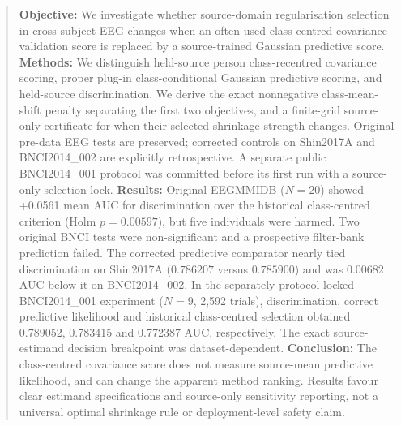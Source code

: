 \begin{abstract}
\textbf{Objective:} We investigate whether
source-domain regularisation selection in
cross-subject EEG changes when an
often-used class-centred covariance
validation score is replaced by a
source-trained Gaussian predictive score.
\textbf{Methods:} We distinguish held-source
person class-recentred covariance scoring,
proper plug-in class-conditional Gaussian
predictive scoring, and held-source
discrimination. We derive the exact
nonnegative class-mean-shift penalty
separating the first two objectives,
and a finite-grid source-only certificate
for when their selected shrinkage
strength changes. Original pre-data
EEG tests are preserved; corrected
controls on Shin2017A and
BNCI2014\_002 are explicitly
retrospective. A separate public
BNCI2014\_001 protocol was
committed before its first run
with a source-only selection lock.
\textbf{Results:} Original EEGMMIDB
(\(N=20\)) showed +0.0561 mean
AUC for discrimination over the
historical class-centred criterion
(Holm \(p=0.00597\)), but five
individuals were harmed. Two
original BNCI tests were
non-significant and a prospective
filter-bank prediction failed.
The corrected predictive comparator
nearly tied discrimination on
Shin2017A (\(0.786207\) versus
\(0.785900\)) and was 0.00682 AUC
below it on BNCI2014\_002.
In the separately protocol-locked
BNCI2014\_001 experiment
(\(N=9\), 2,592 trials), discrimination,
correct predictive likelihood and
historical class-centred selection
obtained 0.789052, 0.783415
and 0.772387 AUC, respectively.
The exact source-estimand decision
breakpoint was dataset-dependent.
\textbf{Conclusion:} The class-centred
covariance score does not measure
source-mean predictive likelihood,
and can change the apparent method
ranking. Results favour clear
estimand specifications and
source-only sensitivity reporting,
not a universal optimal shrinkage
rule or deployment-level safety claim.
\end{abstract}
